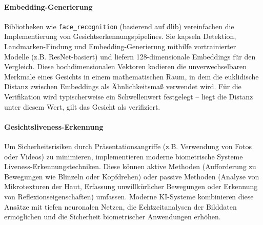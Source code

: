 \paragraph{Embedding-Generierung} 
Bibliotheken wie \texttt{face\_recognition} (basierend auf dlib) vereinfachen die Implementierung von Gesichtserkennungspipelines. Sie kapseln Detektion, Landmarken-Findung und Embedding-Generierung mithilfe vortrainierter Modelle (z.B. ResNet-basiert) und liefern 128-dimensionale Embeddings für den Vergleich. Diese hochdimensionalen Vektoren kodieren die unverwechselbaren Merkmale eines Gesichts in einem mathematischen Raum, in dem die euklidische Distanz zwischen Embeddings als Ähnlichkeitsmaß verwendet wird. Für die Verifikation wird typischerweise ein Schwellenwert festgelegt – liegt die Distanz unter diesem Wert, gilt das Gesicht als verifiziert.

\paragraph{Gesichtsliveness-Erkennung}
Um Sicherheitsrisiken durch Präsentationsangriffe (z.B. Verwendung von Fotos oder Videos) zu minimieren, implementieren moderne biometrische Systeme Liveness-Erkennungstechniken. Diese können aktive Methoden (Aufforderung zu Bewegungen wie Blinzeln oder Kopfdrehen) oder passive Methoden (Analyse von Mikrotexturen der Haut, Erfassung unwillkürlicher Bewegungen oder Erkennung von Reflexionseigenschaften) umfassen. Moderne KI-Systeme kombinieren diese Ansätze mit tiefen neuronalen Netzen, die Echtzeitanalysen der Bilddaten ermöglichen und die Sicherheit biometrischer Anwendungen erhöhen.
